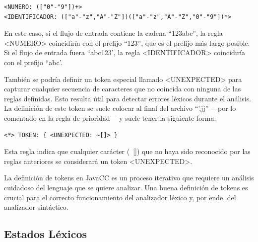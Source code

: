 \lstset{inputencoding=utf8/latin1}
\begin{lstlisting}
<NUMERO: (["0"-"9"])+>
<IDENTIFICADOR: (["a"-"z","A"-"Z"])(["a"-"z","A"-"Z","0"-"9"])*>
\end{lstlisting}

En este caso, si el flujo de entrada contiene la cadena ``123abc'', la regla <NUMERO> coincidiría con el prefijo ``123'', que es el prefijo más largo posible. Si el flujo de entrada fuera ``abc123', la regla <IDENTIFICADOR> coincidiría con el prefijo ``abc'.

También se podría definir un token especial llamado <UNEXPECTED> para capturar cualquier secuencia de caracteres que no coincida con ninguna de las reglas definidas. Esto resulta útil para detectar errores léxicos durante el análisis. La definición de este token se suele colocar al final del archivo ``'.jj'' ---por lo comentado en la regla de prioridad--- y suele tener la siguiente forma:

\lstset{inputencoding=utf8/latin1}
\begin{lstlisting}
<*> TOKEN: { <UNEXPECTED: ~[]> }
\end{lstlisting}

Esta regla indica que cualquier carácter (~[]) que no haya sido reconocido por las reglas anteriores se considerará un token <UNEXPECTED>.

La definición de tokens en JavaCC es un proceso iterativo que requiere un análisis cuidadoso del lenguaje que se quiere analizar. Una buena definición de tokens es crucial para el correcto funcionamiento del analizador léxico y, por ende, del analizador sintáctico.

\subsection{Estados Léxicos}


